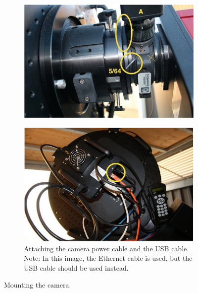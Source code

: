 \documentclass[a4paper, 11pt, fleqn]{memoir}
\begin{document}
\begin{figure}
    \centering
    \begin{subfigure}[t]{0.45\textwidth}
        \centering
        \includegraphics[width=\textwidth]{attach-ccd}
        \label{fig:camera-attach}
    \end{subfigure}
    \begin{subfigure}[t]{0.45\textwidth}
        \centering
        \includegraphics[width=\textwidth]{ccd-cables}
        \caption{Attaching the camera power cable and the USB cable.
            Note: In this image, the Ethernet cable is used, but the USB cable should be used instead.
        }
        \label{fig:camera-cables}
    \end{subfigure}
    \caption{Mounting the camera}
\end{figure}
\end{document}
